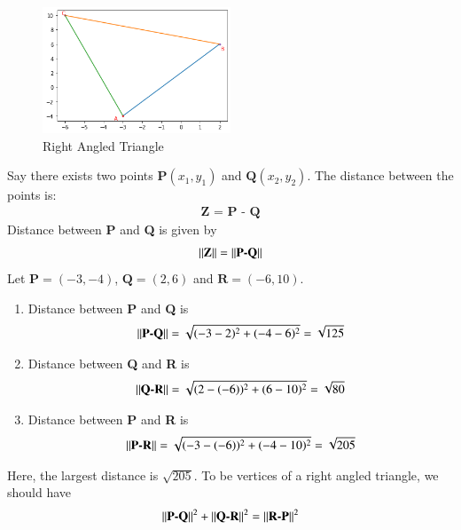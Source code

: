 \begin{figure}[h!]

\centering
\includegraphics[width=0.5\textwidth]{solutions/1/1/4/Figure_1}
\caption{Right Angled Triangle}
\label{eq:solutions/1/1/4/fig:triangle}
\end{figure}
Say there exists two points $\textbf{P}(x_1, y_1)$ and $\textbf{Q}(x_2, y_2)$. The distance between the points is:
\begin{align}
    \textbf{Z = P - Q}
\end{align}
Distance between \textbf{P} and \textbf{Q} is given by 
\begin{align}
||\textbf{Z}|| = \left\lVert\textbf{P-Q}\right\rVert
\end{align}
Let $\textbf{P} = (-3, -4)$, $\textbf{Q} = (2, 6)$ and $\textbf{R} = (-6, 10)$.
\begin{enumerate}
    \item Distance between \textbf{P} and \textbf{Q} is 
\begin{align}
\left\lVert\textbf{P-Q}\right\rVert = \sqrt{(-3-2)^2+(-4-6)^2}
=\sqrt{125}
\end{align}
\item Distance between \textbf{Q} and \textbf{R} is 
\begin{align}
\left\lVert\textbf{Q-R}\right\rVert = \sqrt{(2-(-6))^2+(6-10)^2}
=\sqrt{80}
\end{align}
\item Distance between \textbf{P} and \textbf{R} is 
\begin{align}
\left\lVert\textbf{P-R}\right\rVert = \sqrt{(-3-(-6))^2+(-4-10)^2}
=\sqrt{205}
\end{align}
\end{enumerate}
Here, the largest distance is $\sqrt{205}$. To be vertices of a right angled triangle, we should have 
\begin{align}
  \left\lVert\textbf{P-Q}\right\rVert^2 + \left\lVert\textbf{Q-R}\right\rVert^2 = \left\lVert\textbf{R-P}\right\rVert^2
\end{align}
